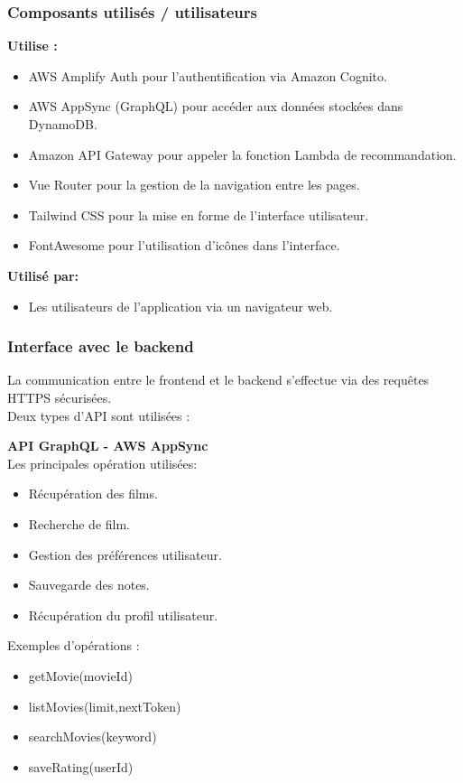 \documentclass[a4paper,12pt]{report}
\begin{document}
\subsubsection{Composants utilisés / utilisateurs}
\textbf{Utilise :} 
\begin{itemize}
    \item AWS Amplify Auth pour l’authentification via Amazon Cognito.
    \item AWS AppSync (GraphQL) pour accéder aux données stockées dans DynamoDB.
    \item Amazon API Gateway pour appeler la fonction Lambda de recommandation.
    \item Vue Router pour la gestion de la navigation entre les pages.
    \item Tailwind CSS pour la mise en forme de l’interface utilisateur.
    \item FontAwesome pour l’utilisation d’icônes dans l’interface.
\end{itemize}
\textbf{Utilisé par:} 
\begin{itemize}
    \item Les utilisateurs de l'application via un navigateur web.
\end{itemize}

\subsubsection{Interface avec le backend}
La communication entre le frontend et le backend s’effectue via des requêtes HTTPS sécurisées.\\
Deux types d'API sont utilisées :

\textbf{API GraphQL - AWS AppSync}\\
Les principales opération utilisées:
\begin{itemize}
    \item Récupération des films.
    \item Recherche de film.
    \item Gestion des préférences utilisateur.
    \item Sauvegarde des notes.
    \item Récupération du profil utilisateur.
\end{itemize}
Exemples d'opérations :
\begin{itemize}
    \item getMovie(movieId)
    \item listMovies(limit,nextToken)
    \item searchMovies(keyword)
    \item saveRating(userId)
\end{itemize}
\end{document}
